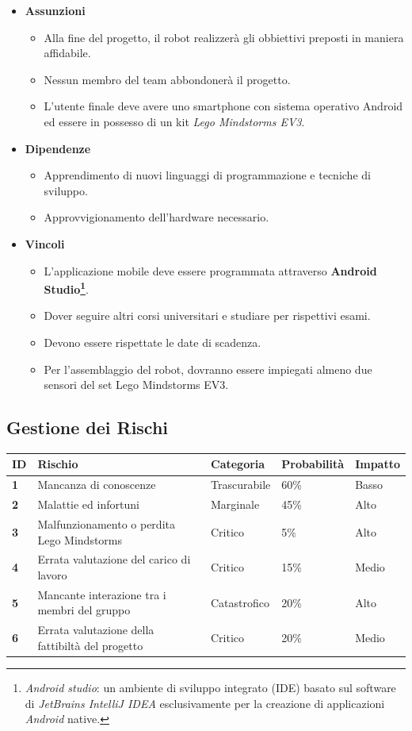 \documentclass{article}
\begin{document}
  \begin{itemize}
  \item
    \textbf{Assunzioni}
  
    \begin{itemize}
    \item
      Alla fine del progetto, il robot realizzerà gli obbiettivi preposti
      in maniera affidabile.
    \item
      Nessun membro del team abbondonerà il progetto.
    \item
      L'utente finale deve avere uno smartphone con sistema operativo Android ed essere in possesso di un kit \emph{Lego Mindstorms EV3}.
    \end{itemize}
  \item
    \textbf{Dipendenze}
  
    \begin{itemize}
    \item
      Apprendimento di nuovi linguaggi di programmazione e tecniche di
      sviluppo.
    \item
      Approvvigionamento dell'hardware necessario.
    \end{itemize}
  \item
    \textbf{Vincoli}
  
    \begin{itemize}
    \item
      L'applicazione mobile deve essere programmata attraverso
      \textbf{Android Studio\footnote{\emph{Android studio}: un ambiente
        di sviluppo integrato (IDE) basato sul software di \emph{JetBrains
        IntelliJ IDEA} esclusivamente per la creazione di applicazioni
        \emph{Android} native.}}.
    \item
      Dover seguire altri corsi universitari e studiare per rispettivi esami.
    \item
      Devono essere rispettate le date di scadenza.
    \item
      Per l'assemblaggio del robot, dovranno essere impiegati almeno due sensori del set Lego Mindstorms EV3.
    \end{itemize}
  \end{itemize}
  
  \subsection{Gestione dei Rischi}
  
  \begin{longtable}[]{@{}lllll@{}}
  \toprule
  ID & Rischio & Categoria & Probabilità & Impatto\tabularnewline
  \midrule
  \endhead
  \textbf{1} & Mancanza di conoscenze & Trascurabile & 60\% &
  Basso\tabularnewline
  \textbf{2} & Malattie ed infortuni & Marginale & 45\% &
  Alto\tabularnewline
  \textbf{3} & Malfunzionamento o perdita Lego Mindstorms & Critico & 5\% &
  Alto\tabularnewline
  \textbf{4} & Errata valutazione del carico di lavoro & Critico & 15\% &
  Medio\tabularnewline
  \textbf{5} & Mancante interazione tra i membri del gruppo & Catastrofico
  & 20\% & Alto\tabularnewline
  \textbf{6} & Errata valutazione della fattibiltà del progetto & Critico
  & 20\% & Medio\tabularnewline
  \bottomrule
  \end{longtable}
  
\end{document}
